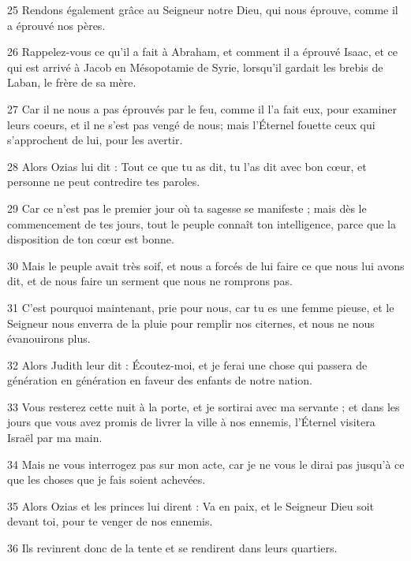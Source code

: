 \par 25 Rendons également grâce au Seigneur notre Dieu, qui nous éprouve, comme il a éprouvé nos pères.
\par 26 Rappelez-vous ce qu'il a fait à Abraham, et comment il a éprouvé Isaac, et ce qui est arrivé à Jacob en Mésopotamie de Syrie, lorsqu'il gardait les brebis de Laban, le frère de sa mère.
\par 27 Car il ne nous a pas éprouvés par le feu, comme il l'a fait eux, pour examiner leurs coeurs, et il ne s'est pas vengé de nous; mais l'Éternel fouette ceux qui s'approchent de lui, pour les avertir.
\par 28 Alors Ozias lui dit : Tout ce que tu as dit, tu l'as dit avec bon cœur, et personne ne peut contredire tes paroles.
\par 29 Car ce n'est pas le premier jour où ta sagesse se manifeste ; mais dès le commencement de tes jours, tout le peuple connaît ton intelligence, parce que la disposition de ton cœur est bonne.
\par 30 Mais le peuple avait très soif, et nous a forcés de lui faire ce que nous lui avons dit, et de nous faire un serment que nous ne romprons pas.
\par 31 C'est pourquoi maintenant, prie pour nous, car tu es une femme pieuse, et le Seigneur nous enverra de la pluie pour remplir nos citernes, et nous ne nous évanouirons plus.
\par 32 Alors Judith leur dit : Écoutez-moi, et je ferai une chose qui passera de génération en génération en faveur des enfants de notre nation.
\par 33 Vous resterez cette nuit à la porte, et je sortirai avec ma servante ; et dans les jours que vous avez promis de livrer la ville à nos ennemis, l'Éternel visitera Israël par ma main.
\par 34 Mais ne vous interrogez pas sur mon acte, car je ne vous le dirai pas jusqu'à ce que les choses que je fais soient achevées.
\par 35 Alors Ozias et les princes lui dirent : Va en paix, et le Seigneur Dieu soit devant toi, pour te venger de nos ennemis.
\par 36 Ils revinrent donc de la tente et se rendirent dans leurs quartiers.


